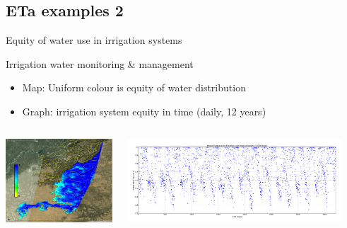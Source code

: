 \documentclass[xcolor=dvipsnames,beamer]{beamer} %
\begin{document}
\subsection{ETa examples 2}
\begin{frame}[fragile]{Equity of water use in irrigation systems}

Irrigation water monitoring \& management
\begin{itemize}
 \item Map: Uniform colour is equity of water distribution
 \item Graph: irrigation system equity in time (daily, 12 years)
\end{itemize}

\begin{columns}[l]
\begin{center}
\includegraphics[width=4cm]{fess2012ef}
\end{center}

\begin{flushright}
  \includegraphics[width=8cm]{fess2012meaneftemporal}
\end{flushright}
\end{columns}

\end{frame}
\end{document}
